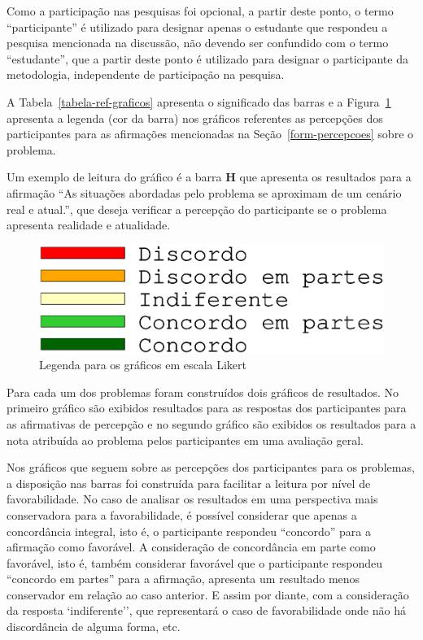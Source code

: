Como a participação nas pesquisas foi opcional, a partir deste ponto, 
o termo  ``participante'' é utilizado para designar apenas 
o estudante que respondeu a pesquisa mencionada na discussão,
não devendo ser confundido com o termo ``estudante'', que a partir deste ponto
é utilizado para designar o participante da metodologia, independente
de participação na pesquisa.

A Tabela~\ref{tabela-ref-graficos} apresenta o significado das barras
e a Figura~\ref{figura-ref-graficos} apresenta a legenda (cor da barra)
nos gráficos referentes as percepções dos participantes para as
afirmações mencionadas na Seção~\ref{form-percepcoes} sobre
o problema.



Um exemplo de leitura do gráfico é a barra \textbf{H} que apresenta
os resultados para a afirmação ``As situações abordadas pelo problema
se aproximam de um cenário real e atual.'', que deseja verificar
a percepção do participante se o problema apresenta realidade
e atualidade.

\begin{figure}[!htb]
\centering
\includegraphics[scale=0.3,trim={0 4cm 0 1.5cm},clip]{figura-ref-graficos.eps}
\caption{Legenda para os gráficos em escala Likert} 
\label{figura-ref-graficos}
\end{figure}

Para cada um dos problemas foram construídos dois gráficos de resultados.
No primeiro gráfico são exibidos resultados para as respostas
dos participantes para as afirmativas de percepção e
no segundo gráfico são exibidos os resultados para a nota atribuída
ao problema pelos participantes em uma avaliação geral.

Nos gráficos que seguem sobre as percepções dos participantes para os
problemas, a disposição nas barras
foi construída para facilitar a leitura por nível de favorabilidade.
No caso de analisar os resultados em uma perspectiva mais conservadora
para a favorabilidade, é possível considerar que apenas a concordância
integral, isto é, o participante respondeu ``concordo'' para
a afirmação como favorável.
A consideração de concordância em parte como favorável,
isto é, também considerar favorável que
o participante respondeu ``concordo em partes'' para a afirmação,
apresenta um resultado menos conservador em relação ao caso anterior.
E assim por diante, com a consideração da resposta `indiferente'', que
representará o caso de favorabilidade onde não há discordância de alguma forma,
etc.

